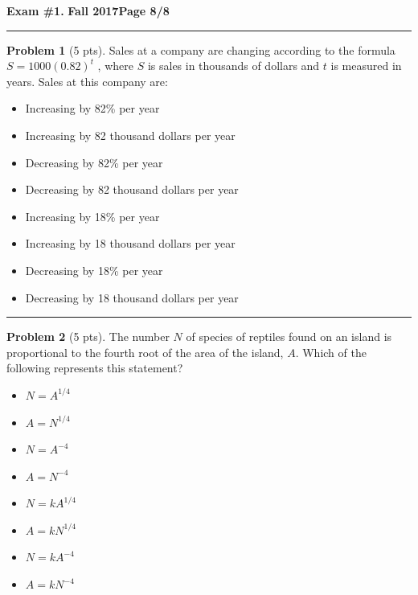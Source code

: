 \documentclass[12pt]{article}
\makeatletter
\theoremstyle{definition}
\newtheorem{problem}{Problem}
\newcommand*{\radiobutton}{%
  \@ifstar{\@radiobutton0}{\@radiobutton1}%
}
\newcommand*{\@radiobutton}[1]{%
  \begin{tikzpicture}
    \pgfmathsetlengthmacro\radius{height("X")/2}
    \draw[radius=\radius] circle;
    \ifcase#1 \fill[radius=.6*\radius] circle;\fi
  \end{tikzpicture}%
}
\makeatother
\begin{document}
\hfill{\large\bf Exam \#1.}\hfill{\large\bf
  Fall 2017}\hfill{\large\bf Page 8/8}\hrule

\bigskip
\begin{problem}[5 pts]
Sales at a company are changing according to the formula $S = 1000 (0.82)^t$ , where $S$ is sales in thousands of dollars and $t$ is measured in years. Sales at this company are:
\begin{itemize}
\item[\radiobutton] Increasing by 82\% per year
\item[\radiobutton] Increasing by 82 thousand dollars per year
\item[\radiobutton] Decreasing by 82\% per year
\item[\radiobutton] Decreasing by 82 thousand dollars per year
\item[\radiobutton] Increasing by 18\% per year
\item[\radiobutton] Increasing by 18 thousand dollars per year
\item[\radiobutton] Decreasing by 18\% per year
\item[\radiobutton] Decreasing by 18 thousand dollars per year
\end{itemize} 
\end{problem}
\hrule

\begin{problem}[5 pts]
The number $N$ of species of reptiles found on an island is proportional to the fourth root of the area of the island, $A$.  Which of the following represents this statement?
\begin{itemize}
\item[\radiobutton] $N=A^{1/4}$
\item[\radiobutton] $A=N^{1/4}$
\item[\radiobutton] $N=A^{-4}$
\item[\radiobutton] $A=N^{-4}$
\item[\radiobutton] $N=kA^{1/4}$
\item[\radiobutton] $A=kN^{1/4}$
\item[\radiobutton] $N=kA^{-4}$
\item[\radiobutton] $A=kN^{-4}$
\end{itemize}
\end{problem}
\end{document}
